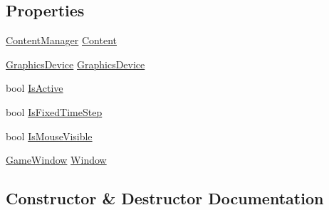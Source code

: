 \subsection*{Properties}
\begin{DoxyCompactItemize}
\item 
\hyperlink{classMicrosoft_1_1Xna_1_1Framework_1_1Content_1_1ContentManager}{Content\+Manager} \hyperlink{classMicrosoft_1_1Xna_1_1Framework_1_1Game_ac8f7f9e7211485788ecd90905fb7b064}{Content}
\item 
\hyperlink{classMicrosoft_1_1Xna_1_1Framework_1_1Graphics_1_1GraphicsDevice}{Graphics\+Device} \hyperlink{classMicrosoft_1_1Xna_1_1Framework_1_1Game_a0effcfeca0faa77862cd406f75026efa}{Graphics\+Device}
\item 
bool \hyperlink{classMicrosoft_1_1Xna_1_1Framework_1_1Game_a92c6b1cf703f9e064f5efc0907f80379}{Is\+Active}
\item 
bool \hyperlink{classMicrosoft_1_1Xna_1_1Framework_1_1Game_aeda6016f0ee24420d205f1bcb4b14a14}{Is\+Fixed\+Time\+Step}
\item 
bool \hyperlink{classMicrosoft_1_1Xna_1_1Framework_1_1Game_a60bc1f580182f7c81f1363f86b21962b}{Is\+Mouse\+Visible}
\item 
\hyperlink{classMicrosoft_1_1Xna_1_1Framework_1_1GameWindow}{Game\+Window} \hyperlink{classMicrosoft_1_1Xna_1_1Framework_1_1Game_aa30ead538db6766e57e95afda44df630}{Window}
\end{DoxyCompactItemize}


\subsection{Constructor \& Destructor Documentation}
\hypertarget{classMicrosoft_1_1Xna_1_1Framework_1_1Game_a98d87ba6bde3f389e92664a2ef9bfcb1}{}
